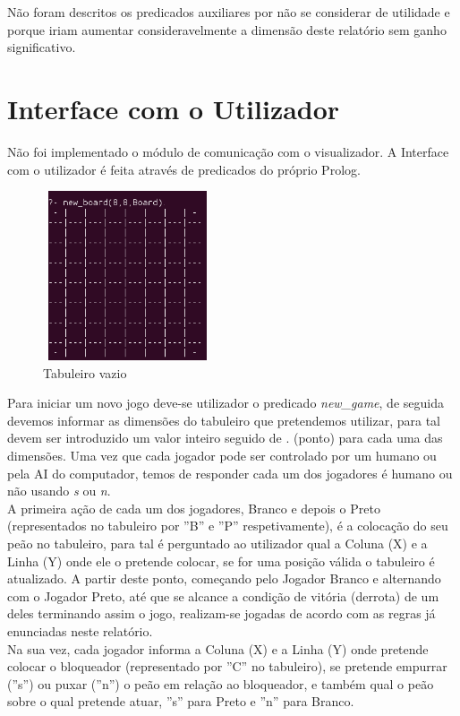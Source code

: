 \documentclass[15pt,a4paper]{article}
\begin{document}
Não foram descritos os predicados auxiliares por não se considerar de utilidade e porque iriam aumentar consideravelmente a dimensão deste relatório sem ganho significativo.\\


\section{Interface com o Utilizador}
Não foi implementado o módulo de comunicação com o visualizador. A Interface com o utilizador é feita através de predicados do próprio Prolog.\\
\begin{figure}[h!]
\begin{center}
\includegraphics[height=5cm,width=5cm]{tabuleiro_vazio.png}
\caption{Tabuleiro vazio}
\label{fig:tabuleiro_vazio}
\end{center}
\end{figure}
Para iniciar um novo jogo deve-se utilizador o predicado \textit{new\_game}, de seguida devemos informar as dimensões do tabuleiro que pretendemos utilizar, para tal devem ser introduzido um valor inteiro seguido de . (ponto) para cada uma das dimensões.
Uma vez que cada jogador pode ser controlado por um humano ou pela AI do computador, temos de responder cada um dos jogadores é humano ou não usando \textit{s} ou \textit{n}.\\
A primeira ação de cada um dos jogadores, Branco e depois o Preto (representados no tabuleiro por ''B'' e ''P'' respetivamente), é a colocação do seu peão no tabuleiro, para tal é perguntado ao utilizador qual a Coluna  (X) e a Linha (Y) onde ele o pretende colocar, se for uma posição válida o tabuleiro é atualizado. A partir deste ponto, começando pelo Jogador Branco e alternando com o Jogador Preto, até que se alcance a condição de vitória (derrota) de um deles terminando assim o jogo, realizam-se jogadas de acordo com as regras já enunciadas neste relatório.\\
Na sua vez, cada jogador informa a Coluna (X) e a Linha (Y) onde pretende colocar o bloqueador (representado por ''C'' no tabuleiro), se pretende empurrar (''s'') ou puxar (''n'') o peão em relação ao bloqueador, e também qual o peão sobre o qual pretende atuar, ''s'' para Preto e ''n'' para Branco.
\end{document}
